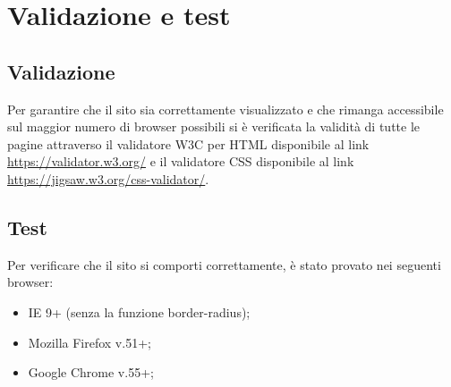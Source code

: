 \section{Validazione e test}
\subsection{Validazione}
Per garantire che il sito sia correttamente visualizzato e che rimanga accessibile sul maggior numero di browser possibili si è verificata la validità di tutte le pagine attraverso il validatore W3C per HTML disponibile al link \url{https://validator.w3.org/} e il validatore CSS disponibile al link \url{https://jigsaw.w3.org/css-validator/}.

\subsection{Test} Per verificare che il sito si comporti correttamente, è stato provato nei seguenti browser: 
\begin{itemize} 	
	\item IE 9+ (senza la funzione border-radius); 	
	\item Mozilla Firefox v.51+; 	
	\item Google Chrome v.55+; 
\end{itemize} 

\newpage